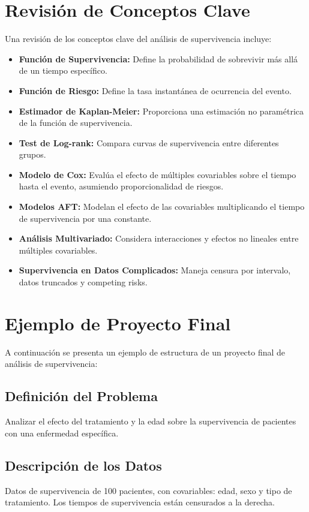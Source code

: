 \documentclass[a4paper]{report} %
\begin{document}
\section{Revisi\'on de Conceptos Clave}
Una revisi\'on de los conceptos clave del an\'alisis de supervivencia incluye:
\begin{itemize}
    \item \textbf{Funci\'on de Supervivencia:} Define la probabilidad de sobrevivir m\'as all\'a de un tiempo espec\'ifico.
    \item \textbf{Funci\'on de Riesgo:} Define la tasa instant\'anea de ocurrencia del evento.
    \item \textbf{Estimador de Kaplan-Meier:} Proporciona una estimaci\'on no param\'etrica de la funci\'on de supervivencia.
    \item \textbf{Test de Log-rank:} Compara curvas de supervivencia entre diferentes grupos.
    \item \textbf{Modelo de Cox:} Eval\'ua el efecto de m\'ultiples covariables sobre el tiempo hasta el evento, asumiendo proporcionalidad de riesgos.
    \item \textbf{Modelos AFT:} Modelan el efecto de las covariables multiplicando el tiempo de supervivencia por una constante.
    \item \textbf{An\'alisis Multivariado:} Considera interacciones y efectos no lineales entre m\'ultiples covariables.
    \item \textbf{Supervivencia en Datos Complicados:} Maneja censura por intervalo, datos truncados y competing risks.
\end{itemize}

\section{Ejemplo de Proyecto Final}
A continuaci\'on se presenta un ejemplo de estructura de un proyecto final de an\'alisis de supervivencia:

\subsection{Definici\'on del Problema}
Analizar el efecto del tratamiento y la edad sobre la supervivencia de pacientes con una enfermedad espec\'ifica.

\subsection{Descripci\'on de los Datos}
Datos de supervivencia de 100 pacientes, con covariables: edad, sexo y tipo de tratamiento. Los tiempos de supervivencia est\'an censurados a la derecha.
\end{document}
